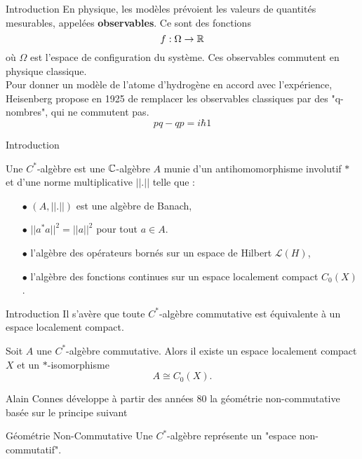\begin{frame}{Introduction}
En physique, les modèles prévoient les valeurs de quantités mesurables, appelées \textbf{observables}. Ce sont des fonctions
\[f:\Omega \rightarrow \mathbb R\]
où $\Omega$ est l'espace de configuration du système. Ces observables commutent en physique classique.\\
\vspace{0.3 cm} 
Pour donner un modèle de l'atome d'hydrogène en accord avec l'expérience, Heisenberg propose en 1925 de remplacer les observables classiques par des "q-nombres", qui ne commutent pas.
\[pq -qp = i\hbar 1\]
\end{frame}

\begin{frame}{Introduction}
\begin{definitionfr}
Une $C^*$-algèbre est une $\mathbb C$-algèbre $A$ munie d'un antihomomorphisme involutif $*$ et d'une norme multiplicative $||.||$ telle que :
\begin{itemize}
\item[$\bullet$] $(A,||.||)$ est une algèbre de Banach,
\item[$\bullet$] $||a^*a||^2 = ||a||^2$ pour tout $a\in A$.
\end{itemize}
\end{definitionfr}

\begin{itemize}
\item[$\bullet$] l'algèbre des opérateurs bornés sur un espace de Hilbert $\mathcal L(H)$, 
\item[$\bullet$] l'algèbre des fonctions continues sur un espace localement compact $C_0(X)$.
\end{itemize}

\end{frame}

\begin{frame}{Introduction}
Il s'avère que toute $C^*$-algèbre commutative est équivalente à un espace localement compact.
\begin{thmfr}
Soit $A$ une $C^*$-algèbre commutative. Alors il existe un espace localement compact $X$ et un $*$-isomorphisme 
\[A\cong C_0(X).\]
\end{thmfr}

Alain Connes développe à partir des années 80 la géométrie non-commutative basée sur le principe suivant
\begin{block}{Géométrie Non-Commutative}
Une $C^*$-algèbre représente un "espace non-commutatif". 
\end{block}

\end{frame}

